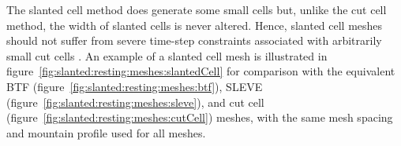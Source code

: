 The slanted cell method does generate some small cells but, unlike the cut cell method, the width of slanted cells is never altered.  Hence, slanted cell meshes should not suffer from severe time-step constraints associated with arbitrarily small cut cells .
An example of a slanted cell mesh is illustrated in figure~\ref{fig:slanted:resting:meshes:slantedCell} for comparison with the equivalent BTF (figure~\ref{fig:slanted:resting:meshes:btf}), SLEVE (figure~\ref{fig:slanted:resting:meshes:sleve}), and cut cell (figure~\ref{fig:slanted:resting:meshes:cutCell}) meshes, with the same mesh spacing and mountain profile used for all meshes.
